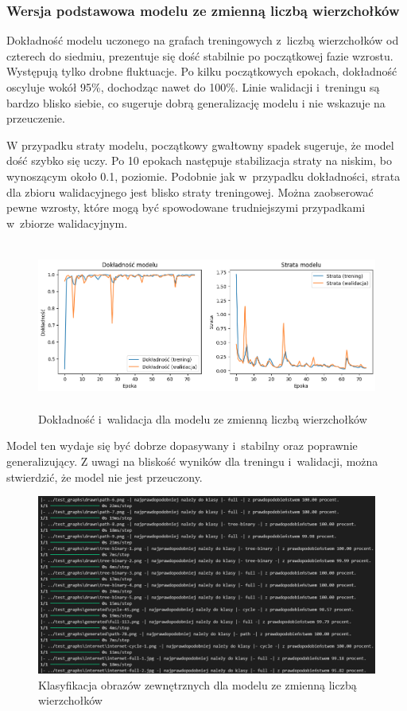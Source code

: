 \subsubsection{Wersja podstawowa modelu ze zmienną liczbą wierzchołków}

Dokładność modelu uczonego na grafach treningowych z~liczbą wierzchołków od czterech do siedmiu,
prezentuje się dość stabilnie po początkowej fazie wzrostu. Występują tylko drobne fluktuacje.
Po kilku początkowych epokach, dokładność oscyluje wokół 95\%, dochodząc nawet do 100\%.
Linie walidacji i~treningu są bardzo blisko siebie, co sugeruje dobrą generalizację modelu
i nie wskazuje na przeuczenie.

W przypadku straty modelu, początkowy gwałtowny spadek sugeruje, że model dość szybko się uczy.
Po 10 epokach następuje stabilizacja straty na niskim, bo wynoszącym około 0.1, poziomie.
Podobnie jak w~przypadku dokładności, strata dla zbioru walidacyjnego jest blisko straty treningowej.
Można zaobserować pewne wzrosty, które mogą być spowodowane trudniejszymi przypadkami w~zbiorze walidacyjnym.

\begin{figure}[ht]
	\centering
	\includegraphics[height=5.5cm]{resources/tests/images/v3/multiple_edges_img.png}
	\caption{Dokładność i~walidacja dla modelu ze zmienną liczbą wierzchołków}
	\label{Fig:tests-var-0a}
\end{figure}
\FloatBarrier

Model ten wydaje się być dobrze dopasywany i~stabilny oraz poprawnie generalizujący.
Z uwagi na bliskość wyników dla treningu i~walidacji, można stwierdzić, że model nie jest przeuczony.

\begin{figure}[ht]
	\centering
	\includegraphics[width=14cm]{resources/tests/images/v3/multiple_edges_txt.png}
	\caption{Klasyfikacja obrazów zewnętrznych dla modelu ze zmienną liczbą wierzchołków}
	\label{Fig:tests-var-0b}
\end{figure}
\FloatBarrier

